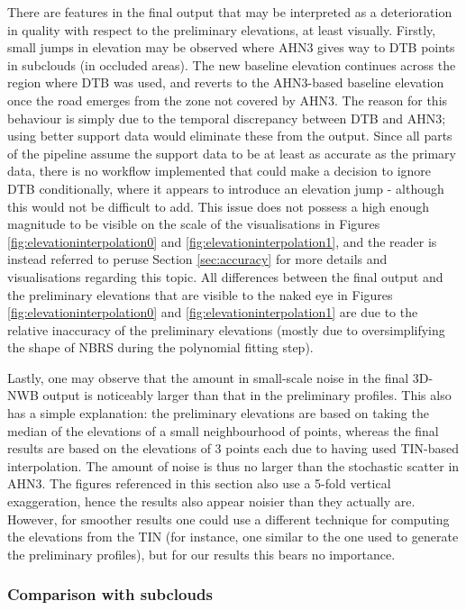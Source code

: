 There are features in the final output that may be interpreted as a deterioration in quality with respect to the preliminary elevations, at least visually. Firstly, small jumps in elevation may be observed where AHN3 gives way to DTB points in subclouds (in occluded areas). The new baseline elevation continues across the region where DTB was used, and reverts to the AHN3-based baseline elevation once the road emerges from the zone not covered by AHN3. The reason for this behaviour is simply due to the temporal discrepancy between DTB and AHN3; using better support data would eliminate these from the output. Since all parts of the pipeline assume the support data to be at least as accurate as the primary data, there is no workflow implemented that could make a decision to ignore DTB conditionally, where it appears to introduce an elevation jump - although this would not be difficult to add. This issue does not possess a high enough magnitude to be visible on the scale of the visualisations in Figures \ref{fig:elevationinterpolation0} and \ref{fig:elevationinterpolation1}, and the reader is instead referred to peruse Section \ref{sec:accuracy} for more details and visualisations regarding this topic. All differences between the final output and the preliminary elevations that are visible to the naked eye in Figures \ref{fig:elevationinterpolation0} and \ref{fig:elevationinterpolation1} are due to the relative inaccuracy of the preliminary elevations (mostly due to oversimplifying the shape of NBRS during the polynomial fitting step).

Lastly, one may observe that the amount in small-scale noise in the final 3D-NWB output is noticeably larger than that in the preliminary profiles. This also has a simple explanation: the preliminary elevations are based on taking the median of the elevations of a small neighbourhood of points, whereas the final results are based on the elevations of 3 points each due to having used TIN-based interpolation. The amount of noise is thus no larger than the stochastic scatter in AHN3. The figures referenced in this section also use a 5-fold vertical exaggeration, hence the results also appear noisier than they actually are. However, for smoother results one could use a different technique for computing the elevations from the TIN (for instance, one similar to the one used to generate the preliminary profiles), but for our results this bears no importance.

\subsubsection{Comparison with subclouds}

